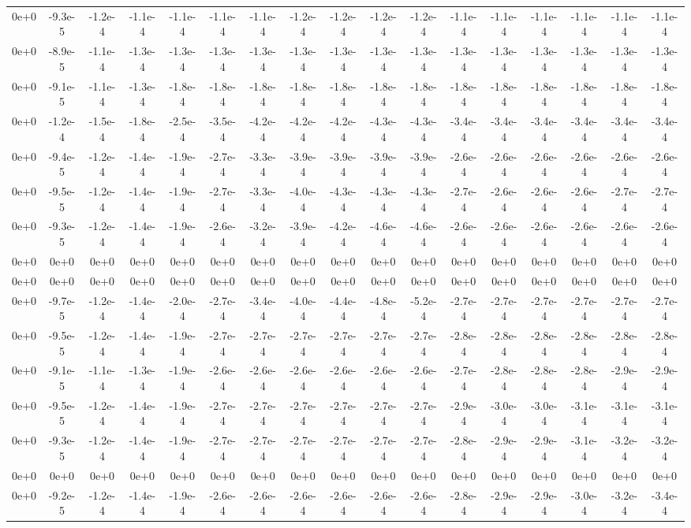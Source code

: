 \documentclass[a4paper,twoside]{article}
\begin{document}
\tiny
\hspace{-70pt}
\begin{tabular}{ccccccccccccccccc}
	0e+0&-9.3e-5&-1.2e-4&-1.1e-4&-1.1e-4&-1.1e-4&-1.1e-4&-1.2e-4&-1.2e-4&-1.2e-4&-1.2e-4&-1.1e-4&-1.1e-4&-1.1e-4&-1.1e-4&-1.1e-4&-1.1e-4\\
	0e+0&-8.9e-5&-1.1e-4&-1.3e-4&-1.3e-4&-1.3e-4&-1.3e-4&-1.3e-4&-1.3e-4&-1.3e-4&-1.3e-4&-1.3e-4&-1.3e-4&-1.3e-4&-1.3e-4&-1.3e-4&-1.3e-4\\
	0e+0&-9.1e-5&-1.1e-4&-1.3e-4&-1.8e-4&-1.8e-4&-1.8e-4&-1.8e-4&-1.8e-4&-1.8e-4&-1.8e-4&-1.8e-4&-1.8e-4&-1.8e-4&-1.8e-4&-1.8e-4&-1.8e-4\\
	0e+0&-1.2e-4&-1.5e-4&-1.8e-4&-2.5e-4&-3.5e-4&-4.2e-4&-4.2e-4&-4.2e-4&-4.3e-4&-4.3e-4&-3.4e-4&-3.4e-4&-3.4e-4&-3.4e-4&-3.4e-4&-3.4e-4\\
	0e+0&-9.4e-5&-1.2e-4&-1.4e-4&-1.9e-4&-2.7e-4&-3.3e-4&-3.9e-4&-3.9e-4&-3.9e-4&-3.9e-4&-2.6e-4&-2.6e-4&-2.6e-4&-2.6e-4&-2.6e-4&-2.6e-4\\
	0e+0&-9.5e-5&-1.2e-4&-1.4e-4&-1.9e-4&-2.7e-4&-3.3e-4&-4.0e-4&-4.3e-4&-4.3e-4&-4.3e-4&-2.7e-4&-2.6e-4&-2.6e-4&-2.6e-4&-2.7e-4&-2.7e-4\\
	0e+0&-9.3e-5&-1.2e-4&-1.4e-4&-1.9e-4&-2.6e-4&-3.2e-4&-3.9e-4&-4.2e-4&-4.6e-4&-4.6e-4&-2.6e-4&-2.6e-4&-2.6e-4&-2.6e-4&-2.6e-4&-2.6e-4\\
	0e+0&0e+0&0e+0&0e+0&0e+0&0e+0&0e+0&0e+0&0e+0&0e+0&0e+0&0e+0&0e+0&0e+0&0e+0&0e+0&0e+0\\
	0e+0&0e+0&0e+0&0e+0&0e+0&0e+0&0e+0&0e+0&0e+0&0e+0&0e+0&0e+0&0e+0&0e+0&0e+0&0e+0&0e+0\\
	0e+0&-9.7e-5&-1.2e-4&-1.4e-4&-2.0e-4&-2.7e-4&-3.4e-4&-4.0e-4&-4.4e-4&-4.8e-4&-5.2e-4&-2.7e-4&-2.7e-4&-2.7e-4&-2.7e-4&-2.7e-4&-2.7e-4\\
	0e+0&-9.5e-5&-1.2e-4&-1.4e-4&-1.9e-4&-2.7e-4&-2.7e-4&-2.7e-4&-2.7e-4&-2.7e-4&-2.7e-4&-2.8e-4&-2.8e-4&-2.8e-4&-2.8e-4&-2.8e-4&-2.8e-4\\
	0e+0&-9.1e-5&-1.1e-4&-1.3e-4&-1.9e-4&-2.6e-4&-2.6e-4&-2.6e-4&-2.6e-4&-2.6e-4&-2.6e-4&-2.7e-4&-2.8e-4&-2.8e-4&-2.8e-4&-2.9e-4&-2.9e-4\\
	0e+0&-9.5e-5&-1.2e-4&-1.4e-4&-1.9e-4&-2.7e-4&-2.7e-4&-2.7e-4&-2.7e-4&-2.7e-4&-2.7e-4&-2.9e-4&-3.0e-4&-3.0e-4&-3.1e-4&-3.1e-4&-3.1e-4\\
	0e+0&-9.3e-5&-1.2e-4&-1.4e-4&-1.9e-4&-2.7e-4&-2.7e-4&-2.7e-4&-2.7e-4&-2.7e-4&-2.7e-4&-2.8e-4&-2.9e-4&-2.9e-4&-3.1e-4&-3.2e-4&-3.2e-4\\
	0e+0&0e+0&0e+0&0e+0&0e+0&0e+0&0e+0&0e+0&0e+0&0e+0&0e+0&0e+0&0e+0&0e+0&0e+0&0e+0&0e+0\\
	0e+0&-9.2e-5&-1.2e-4&-1.4e-4&-1.9e-4&-2.6e-4&-2.6e-4&-2.6e-4&-2.6e-4&-2.6e-4&-2.6e-4&-2.8e-4&-2.9e-4&-2.9e-4&-3.0e-4&-3.2e-4&-3.4e-4\\
\end{tabular} 
\normalsize
\end{document}
